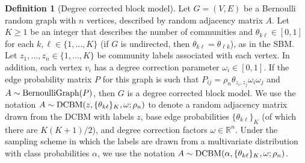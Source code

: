 \documentclass[
  12pt,
]{article}
\theoremstyle{definition}
\newtheorem{definition}{Definition}[section]
\theoremstyle{definition}
\theoremstyle{definition}
\theoremstyle{definition}
\theoremstyle{remark}
\begin{document}
\begin{definition}[Degree corrected block model]
\label{def:dcbm}
Let $G = (V, E)$ be a Bernoulli random graph with $n$ vertices, described by random adjacency matrix $A$. 
Let $K \geq 1$ be an integer that describes the number of communities and $\theta_{k \ell} \in [0, 1]$ for each $k, \ell \in \{1, ..., K\}$ (if $G$ is undirected, then $\theta_{k \ell} = \theta_{\ell k}$), as in the SBM. 
Let $z_1, ..., z_n \in \{1, ..., K\}$ be community labels associated with each vertex. 
In addition, each vertex $v_i$ has a degree correction parameter $\omega_i \in [0, 1]$. 
If the edge probability matrix $P$ for this graph is such that $P_{ij} = \rho_n \theta_{z_i, z_j} \omega_i \omega_j$ and $A \sim \mathrm{BernoulliGraph}(P)$, then $G$ is a degree corrected block model. 
We use the notation $A \sim \mathrm{DCBM}(z, \{\theta_{k \ell}\}_K, \omega; \rho_n)$ to denote a random adjacency matrix drawn from the DCBM with labels $z$, base edge probabilities $\{\theta_{k \ell}\}_K$ (of which there are $K (K+1) / 2$), and degree correction factors $\omega \in \mathbb{R}^n$. 
Under the sampling scheme in which the labels are drawn from a multivariate distribution with class probabilities $\alpha$, we use the notation $A \sim \mathrm{DCBM}(\alpha, \{\theta_{k \ell}\}_K, \omega; \rho_n)$.
\end{definition}
\end{document}
